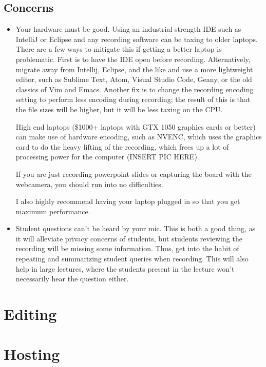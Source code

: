 \documentclass[sigconf]{acmart}
\begin{document}
\subsection{Concerns}
\begin{itemize}
	\item Your hardware must be good. Using an industrial strength IDE such as IntelliJ or Eclipse and any recording software can be taxing to older laptops.
	There are a few  ways to mitigate this  if getting a better laptop is problematic. 
	First is to have the IDE open before recording.
	Alternatively, migrate away from Intellij, Eclipse, and the like and use a more lightweight editor, such as Sublime Text, Atom, Visual Studio Code, Geany, or the old classics of Vim and Emacs.
	Another fix is to change the recording encoding setting to perform less encoding during recording; the result of this is that the file sizes will be higher, but it will be less taxing on the CPU.
	
	High end laptops (\$1000+ laptops with GTX 1050 graphics cards or better) can make use of hardware encoding, such as NVENC, which uses the graphics card to do the heavy lifting of the recording, which frees up a lot of processing power for the computer (INSERT PIC HERE).
	
	
	If you are just recording powerpoint slides or capturing the board with the webcamera, you should run into no difficulties.
	
	I also highly recommend having your laptop plugged in  so that you get maximum performance.
	\item Student questions can't be heard by your mic.  This is both a good thing, as it will alleviate privacy concerns of students, but students  reviewing the recording will be missing some information.  Thus, get into the habit of repeating and summarizing student queries when recording.  This will also help in large lectures, where the students present in the lecture won't necessarily hear the question either.
	
\end{itemize}

\section{Editing}

\section{Hosting}
\end{document}
